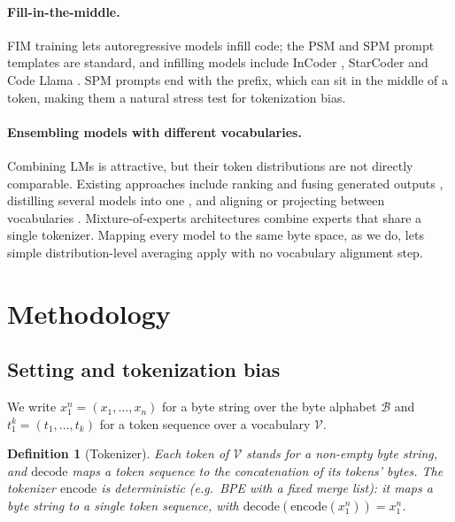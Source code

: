 \documentclass{article} %
\newtheorem{definition}{Definition}
\newcommand{\bytes}{\mathcal{B}}
\newcommand{\vocab}{\mathcal{V}}
\newcommand{\enc}{\mathrm{encode}}
\newcommand{\dec}{\mathrm{decode}}
\begin{document}
\paragraph{Fill-in-the-middle.} FIM training \citep{bavarian2022fim} lets autoregressive models infill code; the PSM and SPM prompt templates are standard, and infilling models include InCoder \citep{fried2023incoder}, StarCoder \citep{li2023starcoder} and Code Llama \citep{roziere2023codellama}. SPM prompts end with the prefix, which can sit in the middle of a token, making them a natural stress test for tokenization bias.

\paragraph{Ensembling models with different vocabularies.} Combining LMs is attractive, but their token distributions are not directly comparable. Existing approaches include ranking and fusing generated outputs \citep{jiang2023llmblender}, distilling several models into one \citep{wan2024fusellm}, and aligning or projecting between vocabularies \citep{xu2024bridging,yu2024breaking}. Mixture-of-experts architectures \citep{jiang2024mixtral} combine experts that share a single tokenizer. Mapping every model to the same byte space, as we do, lets simple distribution-level averaging apply with no vocabulary alignment step.

\section{Methodology}
\label{sec:method}
\subsection{Setting and tokenization bias}
\label{sec:setting}
We write $x_1^n = (x_1,\dots,x_n)$ for a byte string over the byte alphabet $\bytes$ and $t_1^k=(t_1,\dots,t_k)$ for a token sequence over a vocabulary $\vocab$.

\begin{definition}[Tokenizer]\label{def:tokenizer}
Each token of $\vocab$ stands for a non-empty byte string, and $\dec$ maps a token sequence to the concatenation of its tokens' bytes. The tokenizer $\enc$ is deterministic (e.g.\ BPE with a fixed merge list): it maps a byte string to a single token sequence, with $\dec(\enc(x_1^n))=x_1^n$.
\end{definition}
\end{document}
